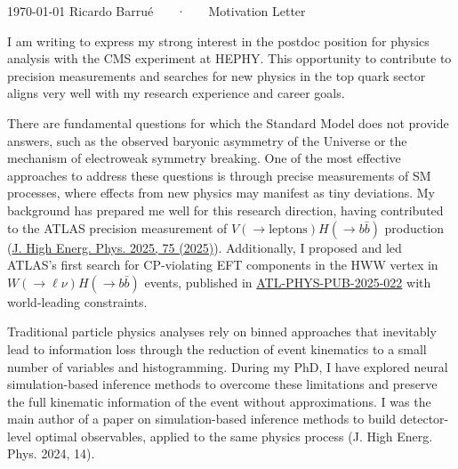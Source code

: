 \documentclass[11pt, a4paper]{awesome-cv}
\begin{document}
\makecvheader[R]

\makecvfooter
  {\today}
  {Ricardo Barrué ~~~·~~~ Motivation Letter}
  {}

\makelettertitle

\begin{cvletter}

  I am writing to express my strong interest in the postdoc position for physics analysis with the CMS experiment at HEPHY. This opportunity to contribute to precision measurements and searches for new physics in the top quark sector aligns very well with my research experience and career goals.

  There are fundamental questions for which the Standard Model does not provide answers, such as the observed baryonic asymmetry of the Universe or the mechanism of electroweak symmetry breaking. One of the most effective approaches to address these questions is through precise measurements of SM processes, where effects from new physics may manifest as tiny deviations. My background has prepared me well for this research direction, having contributed to the ATLAS precision measurement of $V(\to \textrm{leptons})H(\to b\bar{b})$ production (\href{https://doi.org/10.1007/JHEP04(2025)075}{J. High Energ. Phys. 2025, 75 (2025)}). Additionally, I proposed and led ATLAS's first search for CP-violating EFT components in the HWW vertex in $W(\to \ell \nu)H(\to b\bar{b})$ events, published in \href{https://atlas.web.cern.ch/Atlas/GROUPS/PHYSICS/PUBNOTES/ATL-PHYS-PUB-2025-022/}{ATL-PHYS-PUB-2025-022} with world-leading constraints. 
  
  Traditional particle physics analyses rely on binned approaches that inevitably lead to information loss through the reduction of event kinematics to a small number of variables and histogramming. During my PhD, I have explored neural simulation-based inference methods to overcome these limitations and preserve the full kinematic information of the event without approximations. I was the main author of a paper on simulation-based inference methods to build detector-level optimal observables, applied to the same physics process (J. High Energ. Phys. 2024, 14).
  

\end{cvletter}
\end{document}
